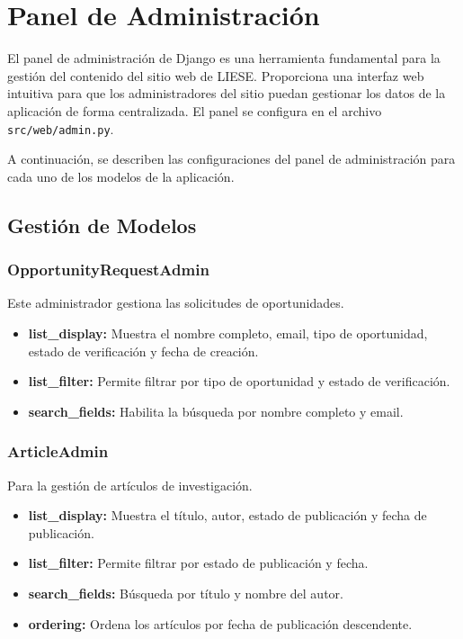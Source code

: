 \chapter{Panel de Administración}
\label{ch:panel_administracion}

El panel de administración de Django es una herramienta fundamental para la gestión del contenido del sitio web de LIESE. Proporciona una interfaz web intuitiva para que los administradores del sitio puedan gestionar los datos de la aplicación de forma centralizada. El panel se configura en el archivo \texttt{src/web/admin.py}.

A continuación, se describen las configuraciones del panel de administración para cada uno de los modelos de la aplicación.

\section{Gestión de Modelos}

\subsection{OpportunityRequestAdmin}
Este administrador gestiona las solicitudes de oportunidades.
\begin{itemize}
    \item \textbf{list\_display:} Muestra el nombre completo, email, tipo de oportunidad, estado de verificación y fecha de creación.
    \item \textbf{list\_filter:} Permite filtrar por tipo de oportunidad y estado de verificación.
    \item \textbf{search\_fields:} Habilita la búsqueda por nombre completo y email.
\end{itemize}

\subsection{ArticleAdmin}
Para la gestión de artículos de investigación.
\begin{itemize}
    \item \textbf{list\_display:} Muestra el título, autor, estado de publicación y fecha de publicación.
    \item \textbf{list\_filter:} Permite filtrar por estado de publicación y fecha.
    \item \textbf{search\_fields:} Búsqueda por título y nombre del autor.
    \item \textbf{ordering:} Ordena los artículos por fecha de publicación descendente.
\end{itemize}

